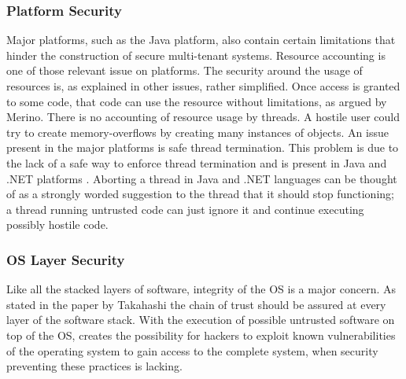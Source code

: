 \subsubsection{Platform Security}
Major platforms, such as the Java platform, also contain certain limitations that hinder the construction of secure multi-tenant systems. Resource accounting is one of those relevant issue on platforms. The security around the usage of resources is, as explained in other issues, rather simplified. Once access is granted to some code, that code can use the resource without limitations, as argued by Merino\cite{Merino2011Security}. There is no accounting of resource usage by threads. A hostile user could try to create memory-overflows by creating many instances of objects.
An issue present in the major platforms is safe thread termination. This problem is due to the lack of a safe way to enforce thread termination and is present in Java and .NET platforms \cite{Merino2011Security}. Aborting a thread in Java and .NET languages can be thought of as a strongly worded suggestion to the thread that it should stop functioning; a thread running untrusted code can just ignore it and continue executing possibly hostile code.

\subsubsection{OS Layer Security}
Like all the stacked layers of software, integrity of the OS is a major concern. As stated in the paper by Takahashi\cite{Takahashi2012Security} the chain of trust should be assured at every layer of the software stack. With the execution of possible untrusted software on top of the OS, creates the possibility for hackers to exploit known vulnerabilities of the operating system to gain access to the complete system, when security preventing these practices is lacking.


